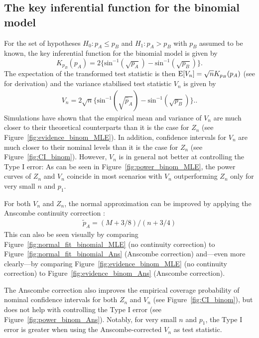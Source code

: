 \subsection{The key inferential function for the binomial model}
\label{subsec:kif binom}
For the set of hypotheses $H_0: p_A \leq p_B$ and $H_1: p_A > p_B$ with $p_B$ assumed to be known, the key inferential function for the binomial model is given by
$$K_{p_B}(p_A) = 2\{\text{sin}^{-1}(\sqrt{p_A})-\text{sin}^{-1}(\sqrt{p_B})\}.$$
The expectation of the transformed test statistic is then $\operatorname{\text{E}}[V_n] = \sqrt{n}K_{p_B}(p_A)$ (see \citet[p.~139--140]{kulinskaya_meta_2008} for derivation) and the variance stabilised test statistic $V_n$ is given by
\begin{align}
    V_n = 2\sqrt{n}\{\text{sin}^{-1}(\sqrt{\hat{p}_A})-\text{sin}^{-1}(\sqrt{p_B})\}. \label{eq:Vn_binom}.
\end{align}
Simulations have shown that the empirical mean and variance of $V_n$ are much closer to their theoretical counterparts than it is the case for $Z_n$ (see Figure~\ref{fig:evidence_binom_MLE}). In addition, confidence intervals for $V_n$ are much closer to their nominal levels than it is the case for $Z_n$ (see Figure~\ref{fig:CI_binom}). However, $V_n$ is in general not better at controlling the Type I error: As can be seen in Figure~\ref{fig:power_binom_MLE}, the power curves of $Z_n$ and $V_n$ coincide in most scenarios with $V_n$ outperforming $Z_n$ only for very small $n$ and $p_1$.\par
For both $V_n$ and $Z_n$, the normal approximation can be improved by applying the Anscombe continuity correction \citep[p.~140--141]{kulinskaya_meta_2008}:
\begin{align}
    \tilde{p}_A = (M+3/8)/(n+3/4) \label{eq:anscombe_correction}   
\end{align}
This can also be seen visually by comparing Figure~\ref{fig:normal_fit_binomial_MLE} (no continuity correction) to Figure~\ref{fig:normal_fit_binomial_Ans} (Anscombe correction) and---even more clearly---by comparing Figure~\ref{fig:evidence_binom_MLE} (no continuity correction) to Figure~\ref{fig:evidence_binom_Ans} (Anscombe correction).\par
The Anscombe correction also improves the empirical coverage probability of nominal confidence intervals for both $Z_n$ and $V_n$ (see Figure~\ref{fig:CI_binom}), but does not help with controlling the Type I error (see Figure~\ref{fig:power_binom_Ans}). Notably, for very small $n$ and $p_1$, the Type I error is greater when using the Anscombe-corrected $V_n$ as test statistic.
\clearpage
